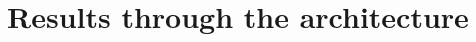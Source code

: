 \section{Results through the architecture}

\newcommand{\twostrips}[2]{%
  {\centering\adjustbox{scale=0.66}{\parbox{\textwidth}{#1}}\par
   \vspace{-0.15em}\adjustbox{scale=0.66}{\parbox{\textwidth}{#2}}\par}\vspace{0.1em}}

